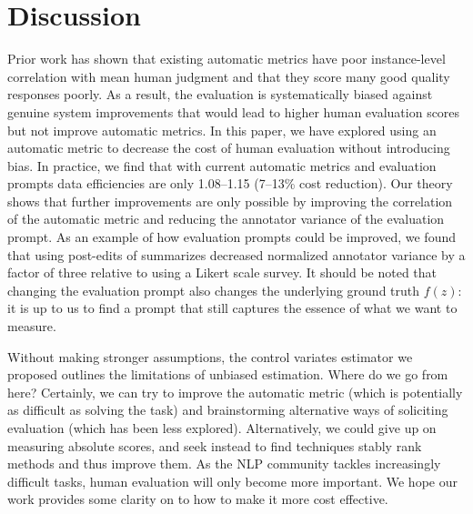 \section{Discussion}
\label{sec:discussion}

Prior work has shown that existing automatic metrics have poor instance-level correlation with mean human judgment and that they score many good quality responses poorly.
As a result, the evaluation is systematically biased against genuine system improvements that would lead to higher human evaluation scores but not improve automatic metrics.
In this paper, we have explored using an automatic metric to decrease the cost of human evaluation without introducing bias.
In practice, we find that with current automatic metrics and evaluation prompts data efficiencies are only 1.08--1.15 (7--13\% cost reduction).
Our theory shows that further improvements are only possible by improving the correlation of the automatic metric and reducing the annotator variance of the evaluation prompt.
As an example of how evaluation prompts could be improved, we found that using post-edits of summarizes decreased normalized annotator variance by a factor of three relative to using a Likert scale survey.
It should be noted that changing the evaluation prompt also changes the underlying ground truth $f(z)$: it is up to us to find a prompt that still captures the essence of what we want to measure.


Without making stronger assumptions, the control variates estimator we proposed outlines the limitations of unbiased estimation.
Where do we go from here?
Certainly, we can try to improve the automatic metric (which is potentially as difficult as solving the task) and brainstorming alternative ways of soliciting evaluation (which has been less explored).
Alternatively, we could give up on measuring absolute scores, and seek instead to find techniques stably rank methods and thus improve them.
As the NLP community tackles increasingly difficult tasks, human evaluation will only become more important.
We hope our work provides some clarity on to how to make it more cost effective.

